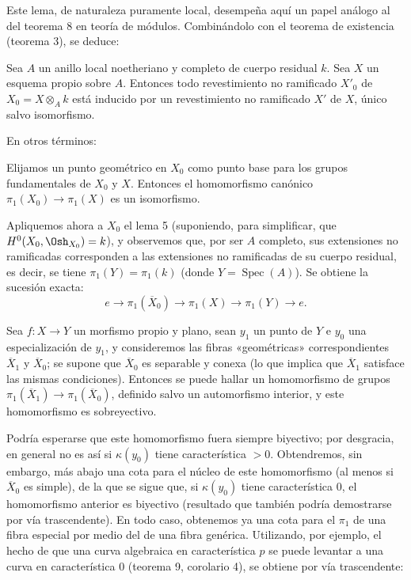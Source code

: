 Este lema, de naturaleza puramente local, desempeña aquí un papel análogo al del
teorema 8 en teoría de módulos. Combinándolo con el teorema de existencia
(teorema 3), se deduce:

 Sea $A$ un anillo local noetheriano y completo de cuerpo
residual $k$. Sea $X$ un esquema propio sobre $A$. Entonces todo revestimiento
no ramificado $X'_0$ de $X_0=X\otimes_A k$ está inducido por un revestimiento no
ramificado $X'$ de $X$, único salvo isomorfismo.

En otros términos:

 Elijamos un punto geométrico en $X_0$ como punto base para
los grupos fundamentales de $X_0$ y $X$. Entonces el homomorfismo canónico
$\pi_1(X_0)\longrightarrow\pi_1(X)$ es un isomorfismo.

Apliquemos ahora a $X_0$ el lema 5 (suponiendo, para simplificar, que
$H^0(X_0,\Osh_{X_0})=k$), y observemos que, por ser $A$ completo, sus
extensiones no ramificadas corresponden a las extensiones no ramificadas de su
cuerpo residual, es decir, se tiene $\pi_1(Y)=\pi_1(k)$ (donde
$Y=\operatorname{Spec}(A)$). Se obtiene la sucesión exacta:
\[
  e\longrightarrow\pi_1(\overline X_0)
  \longrightarrow\pi_1(X)\longrightarrow\pi_1(Y)\longrightarrow e.
\]

 Sea $f:X\longrightarrow Y$ un morfismo propio y plano,
sean $y_1$ un punto de $Y$ e $y_0$ una especialización de $y_1$, y consideremos
las fibras «geométricas» correspondientes $\overline X_1$ y $\overline X_0$;
se supone que $\overline X_0$ es separable y conexa (lo que implica que
$\overline X_1$ satisface las mismas condiciones). Entonces se puede hallar un
homomorfismo de grupos
$\pi_1(\overline X_1)\longrightarrow\pi_1(\overline X_0)$, definido salvo un
automorfismo interior, y este homomorfismo es sobreyectivo.

Podría esperarse que este homomorfismo fuera siempre biyectivo; por desgracia,
en general no es así si $\kappa(y_0)$ tiene característica $>0$. Obtendremos,
sin embargo, más abajo una cota para el núcleo de este homomorfismo (al menos si
$\overline X_0$ es simple), de la que se sigue que, si $\kappa(y_0)$ tiene
característica $0$, el homomorfismo anterior es biyectivo (resultado que también
podría demostrarse por vía trascendente). En todo caso, obtenemos ya una cota
para el $\pi_1$ de una fibra especial por medio del de una fibra genérica.
Utilizando, por ejemplo, el hecho de que una curva algebraica en característica
$p$ se puede levantar a una curva en característica $0$ (teorema 9, corolario
4), se obtiene por vía trascendente:


